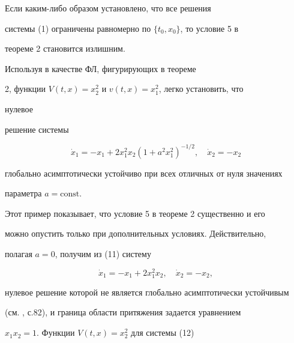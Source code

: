 

\begin{notenonum} Если каким-либо образом установлено, что все решения 


системы (1) ограничены равномерно по $\{t_0,x_0\}$, то условие 5 в 


теореме 2 становится излишним. 


\end{notenonum} 


 




\begin{exam} Используя в качестве ФЛ, фигурирующих в теореме 


2, функции $V(t,x)=x{}^2_2$ и $v(t,x)=x{}^2_1$, легко установить, что 


нулевое 


решение системы 


\begin{equation} 


\Dot x_1=-x_1+2x{}^2_1x_2(1+a^2x{}^2_1)^{-1/2}, 


\quad \Dot x_2=-x_2 


\end{equation} 


глобально асимптотически устойчиво при всех отличных от нуля значениях 


параметра $a=\text{const}$. 


\end{exam} 


 


Этот пример показывает, что условие 5 в теореме 2 существенно и его 


можно опустить только при дополнительных условиях. Действительно, 


полагая $a=0$, получим из (11) систему 


\begin{equation} 


\Dot x_1=-x_1+2x{}^2_1x_2,\quad \Dot x_2=-x_2, 


\end{equation} 


нулевое решение которой не является глобально асимптотически устойчивым 


(см. \cite{Zub}, с.82), и граница области притяжения задается уравнением 


$x_1x_2=1$. Функции $V(t,x)=x{}^2_2$ для системы (12) 


